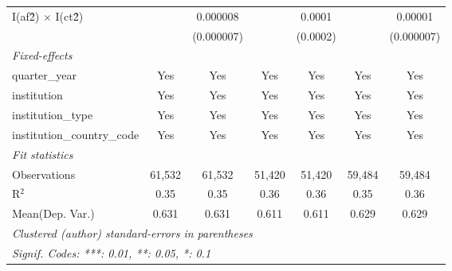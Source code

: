 \begin{tabular}{lcccccc}
   I(af\^2) $\times$ I(ct\^2)         &               & 0.000008      &               & 0.0001        &               & 0.00001\\   
                                      &               & (0.000007)    &               & (0.0002)      &               & (0.000007)\\   
   \midrule
   \emph{Fixed-effects}\\
   quarter\_year                      & Yes           & Yes           & Yes           & Yes           & Yes           & Yes\\  
   institution                        & Yes           & Yes           & Yes           & Yes           & Yes           & Yes\\  
   institution\_type                  & Yes           & Yes           & Yes           & Yes           & Yes           & Yes\\  
   institution\_country\_code         & Yes           & Yes           & Yes           & Yes           & Yes           & Yes\\  
   \midrule
   \emph{Fit statistics}\\
   Observations                       & 61,532        & 61,532        & 51,420        & 51,420        & 59,484        & 59,484\\  
   R$^2$                              & 0.35          & 0.35          & 0.36          & 0.36          & 0.35          & 0.36\\  
Mean(Dep. Var.) & 0.631 & 0.631 & 0.611 & 0.611 & 0.629 & 0.629 \\
   \midrule \midrule
   \multicolumn{7}{l}{\emph{Clustered (author) standard-errors in parentheses}}\\
   \multicolumn{7}{l}{\emph{Signif. Codes: ***: 0.01, **: 0.05, *: 0.1}}\\
\end{tabular}
\par\endgroup
